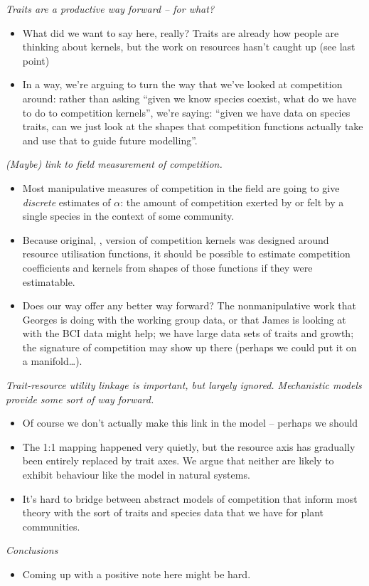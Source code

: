 \documentclass[a4paper,11pt]{article}
\begin{document}
\textit{Traits are a productive way forward -- for what?}
\begin{itemize}
\item What did we want to say here, really?  Traits are already how
  people are thinking about kernels, but the work on resources hasn't
  caught up (see last point)
\item In a way, we're arguing to turn the way that we've looked at
  competition around: rather than asking ``given we know species
  coexist, what do we have to do to competition kernels'', we're
  saying: ``given we have data on species traits, can we just look at
  the shapes that competition functions actually take and use that to
  guide future modelling''.
\end{itemize}

\textit{(Maybe) link to field measurement of competition.}
\begin{itemize}
\item Most manipulative measures of competition in the field are going
  to give \emph{discrete} estimates of $\alpha$: the amount of
  competition exerted by or felt by a single species in the context of
  some community.
\item Because original, \citet{MacArthur-1967}, version of competition
  kernels was designed around resource utilisation functions, it
  should be possible to estimate competition coefficients and kernels
  from shapes of those functions if they were estimatable.
\item Does our way offer any better way forward?  The nonmanipulative
  work that Georges is doing with the working group data, or that
  James is looking at with the BCI data might help; we have large data
  sets of traits and growth; the signature of competition may show up
  there (perhaps we could put it on a manifold\ldots).
\end{itemize}

\textit{Trait-resource utility linkage is important, but largely
  ignored.  Mechanistic models provide some sort of way forward.}
\begin{itemize}
\item Of course we don't actually make this link in the model --
  perhaps we should
\item The 1:1 mapping happened very quietly, but the resource axis has
  gradually been entirely replaced by trait axes.  We argue that
  neither are likely to exhibit behaviour like the
  \citet{MacArthur-1967} model in natural systems.
\item It's hard to bridge between abstract models of competition that
  inform most theory with the sort of traits and species data that we
  have for plant communities.
\end{itemize}

\textit{Conclusions}
\begin{itemize}
\item Coming up with a positive note here might be hard.
\end{itemize}

\clearpage


\end{document}
